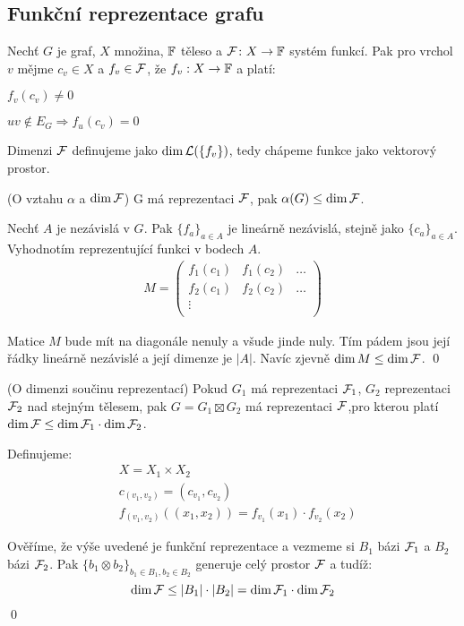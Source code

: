 \subsection{Funkční reprezentace grafu}

\df Nechť $G$ je graf, $X$ množina, $\mathbb{F}$ těleso a $\mathcal{F}\colon X\rightarrow\mathbb{F}$ systém funkcí. Pak pro vrchol $v$ mějme $c_v\in X$ a $f_v \in \mathcal{F}$, že
$f_v: X \to \mathbb{F}$ a platí:
\begin{enumerate*}
	\item $f_v(c_v) \neq 0$
	\item $uv \notin E_G \Rightarrow f_u(c_v) = 0$
\end{enumerate*}

\df Dimenzi $\mathcal{F}$ definujeme jako $\dim\mathcal{L}(\{f_v\})$, tedy chápeme funkce
jako vektorový prostor.

\lm(O vztahu $\alpha$ a $\dim\mathcal{F}$) G má reprezentaci $\mathcal{F}$, pak $\alpha(G)
\leq \dim \mathcal{F}$.

\dk Nechť $A$ je nezávislá v $G$. Pak $\{f_a\}_{a\in A}$ je lineárně
nezávislá, stejně jako $\{c_a\}_{a\in A}$. Vyhodnotím reprezentující
funkci v bodech $A$.
\begin{align}
M = \left(
	\begin{matrix}
		f_1(c_1) & f_1(c_2) & \dots \\
		f_2(c_1) & f_2(c_2) & \dots \\
		\vdots &&\\
	\end{matrix}\right)
\end{align}

Matice $M$ bude mít na diagonále nenuly a všude jinde nuly. Tím pádem
jsou její řádky lineárně nezávislé a její dimenze je $|A|$. Navíc zjevně
$\dim M \le \dim\mathcal{F}$.
\qed


\lm(O dimenzi součinu reprezentací) Pokud $G_1$ má reprezentaci $\mathcal{F}_1$,
$G_2$ reprezentaci $\mathcal{F}_2$ nad stejným tělesem, pak $G = G_1 \boxtimes
G_2$ má reprezentaci $\mathcal{F}$,pro kterou platí $\dim\mathcal{F} \leq \dim\mathcal{F}_1 \cdot \dim\mathcal{F}_2$.

\dk Definujeme: 
\begin{align*}
& X = X_1 \times X_2 \\
& c_{(v_1,v_2)} = (c_{v_1}, c_{v_2}) \\
& f_{(v_1, v_2)}((x_1,x_2)) = f_{v_1}(x_1) \cdot f_{v_2}(x_2)
\end{align*}

Ověříme, že výše uvedené je funkční reprezentace a vezmeme si $B_1$ bázi
$\mathcal{F}_1$ a $B_2$ bázi $\mathcal{F}_2$. Pak $\{b_1 \otimes b_2\}_{b_1\in B_1, b_2\in
B_2}$ generuje celý prostor $\mathcal{F}$ a tudíž:
$$
	\dim\mathcal{F} \le |B_1|\cdot |B_2| = \dim\mathcal{F}_1 \cdot \dim\mathcal{F}_2
$$
\qed

